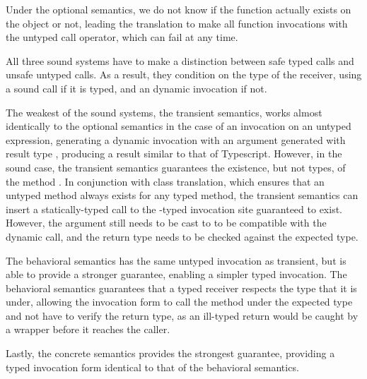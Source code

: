 \documentclass{tex/llncs}
\begin{document}
Under the optional semantics, we do not know if the function actually exists
on the object or not, leading the translation to make all function invocations
with the untyped call operator, which can fail at any time.

All three sound systems have to make a distinction between safe typed calls and
unsafe untyped calls. As a result, they condition on the type of the receiver, 
using a sound call if it is typed, and an dynamic invocation if not.

The weakest of the sound systems, the transient semantics, works almost
identically to the optional semantics in the case of an invocation on an
untyped expression, generating a dynamic invocation with an argument generated
with result type \any, producing a result similar to that of Typescript.
However, in the sound case, the transient semantics guarantees the existence,
but not types, of the method \m. In conjunction with class translation, which
ensures that an untyped method always exists for any typed method, the
transient semantics can insert a statically-typed call to the \any-typed
invocation site guaranteed to exist. However, the argument still needs to
be cast to \any to be compatible with the dynamic call, and the return type
needs to be checked against the expected type.

The behavioral semantics has the same untyped invocation as transient, but 
is able to provide a stronger guarantee, enabling a simpler typed invocation.
The behavioral semantics guarantees that a typed receiver respects the type
that it is under, allowing the invocation form to call the method under the
expected type and not have to verify the return type, as an ill-typed return
would be caught by a wrapper before it reaches the caller.

Lastly, the concrete semantics provides the strongest guarantee, providing a 
typed invocation form identical to that of the behavioral semantics. 
\end{document}
